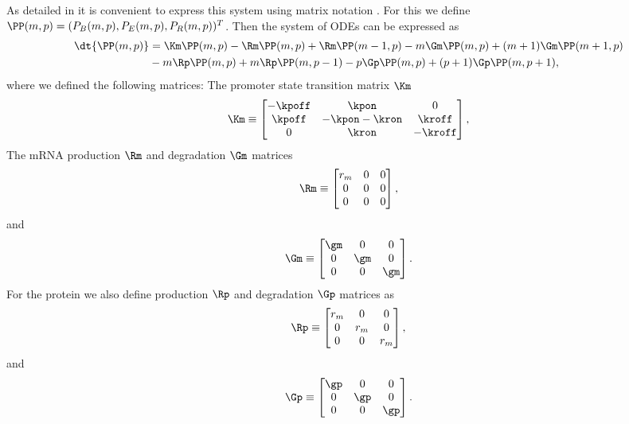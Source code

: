 As detailed in  it is convenient to express this system using
matrix notation \cite{Sanchez2013}. For this we define $\PP(m, p) = (P_B(m, p),
P_E(m, p), P_R(m, p))^T$. Then the system of ODEs can be expressed as
\begin{equation}
  \begin{aligned}
    \dt{\PP(m, p)} &= \Km \PP(m, p)
    - \Rm \PP(m, p) + \Rm \PP(m-1, p)
    - m \Gm \PP(m, p) + (m + 1) \Gm \PP(m + 1, p)\\
    &- m \Rp \PP(m, p) + m \Rp \PP(m, p - 1)
    - p \Gp \PP(m, p) + (p + 1) \Gp \PP(m, p + 1),
  \end{aligned}
\end{equation}
where we defined the following matrices: The promoter state transition matrix
$\Km$
\begin{align}
  \Km \equiv
  \begin{bmatrix}
    -\kpoff   & \kpon         & 0\\
    \kpoff    & -\kpon -\kron  & \kroff\\
    0         & \kron         & -\kroff
  \end{bmatrix},
\end{align}
The mRNA production $\Rm$ and degradation $\Gm$ matrices
\begin{equation}
  \Rm \equiv
  \begin{bmatrix}
    r_m   & 0 & 0\\
    0     & 0 & 0\\
    0     & 0 & 0\\
  \end{bmatrix},
\end{equation}
and
\begin{equation}
  \Gm \equiv
  \begin{bmatrix}
    \gm   & 0   & 0\\
    0     & \gm & 0\\
    0     & 0   & \gm\\
  \end{bmatrix}.
\end{equation}
For the protein we also define production $\Rp$ and degradation $\Gp$ matrices
as
\begin{equation}
  \Rp \equiv
  \begin{bmatrix}
    r_m   & 0   & 0\\
    0     & r_m & 0\\
    0     & 0   & r_m\\
  \end{bmatrix},
\end{equation}
and
\begin{equation}
  \Gp \equiv
  \begin{bmatrix}
    \gp   & 0   & 0\\
    0     & \gp & 0\\
    0     & 0   & \gp\\
  \end{bmatrix}.
\end{equation}

